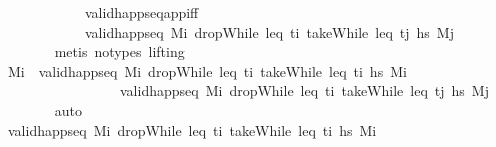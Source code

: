 \begin{isabellebody}
\ \ \ \ \ \ \ \ \ \ \ \ valid{\isacharunderscore}{\kern0pt}happ{\isacharunderscore}{\kern0pt}seq{\isacharunderscore}{\kern0pt}app{\isacharunderscore}{\kern0pt}iff\isanewline
\ \ \ \ \ \ \ \ \ \ \ \ {\isacartoucheopen}valid{\isacharunderscore}{\kern0pt}happ{\isacharunderscore}{\kern0pt}seq\ M\isactrlsub i\ {\isacharparenleft}{\kern0pt}dropWhile\ {\isacharparenleft}{\kern0pt}leq\ t\isactrlsub i{\isacharparenright}{\kern0pt}\ {\isacharparenleft}{\kern0pt}takeWhile\ {\isacharparenleft}{\kern0pt}leq\ t\isactrlsub j{\isacharparenright}{\kern0pt}\ hs\ M\isactrlsub j{\isacartoucheclose}\ \isanewline
\ \ \ \ \ \ \isamarkupfalse%
\ {\isacharparenleft}{\kern0pt}metis\ {\isacharparenleft}{\kern0pt}no{\isacharunderscore}{\kern0pt}types{\isacharcomma}{\kern0pt}\ lifting{\isacharparenright}{\kern0pt}{\isacharparenright}{\kern0pt}\isanewline
\ \ \ \ \isamarkupfalse%
\ \isamarkupfalse%
\ M\isactrlsub i{\isacharprime}{\kern0pt}\ \ {\isachardoublequoteopen}valid{\isacharunderscore}{\kern0pt}happ{\isacharunderscore}{\kern0pt}seq\ M\isactrlsub i\ {\isacharparenleft}{\kern0pt}dropWhile\ {\isacharparenleft}{\kern0pt}leq\ t\isactrlsub i{\isacharparenright}{\kern0pt}\ {\isacharparenleft}{\kern0pt}takeWhile\ {\isacharparenleft}{\kern0pt}leq\ t\isactrlsub i{\isacharprime}{\kern0pt}{\isacharparenright}{\kern0pt}\ hs\ M\isactrlsub i{\isacharprime}{\kern0pt}{\isachardoublequoteclose}\isanewline
\ \ \ \ \ \ \ \ \ \ \ \ \ \ \ \ \ {\isachardoublequoteopen}valid{\isacharunderscore}{\kern0pt}happ{\isacharunderscore}{\kern0pt}seq\ M\isactrlsub i{\isacharprime}{\kern0pt}\ {\isacharparenleft}{\kern0pt}dropWhile\ {\isacharparenleft}{\kern0pt}leq\ t\isactrlsub i{\isacharprime}{\kern0pt}{\isacharparenright}{\kern0pt}\ {\isacharparenleft}{\kern0pt}takeWhile\ {\isacharparenleft}{\kern0pt}leq\ t\isactrlsub j{\isacharparenright}{\kern0pt}\ hs\ M\isactrlsub j{\isachardoublequoteclose}\isanewline
\ \ \ \ \ \ \isamarkupfalse%
\ auto\isanewline
\ \ \ \ \isamarkupfalse%
\ \isamarkupfalse%
\ {\isachardoublequoteopen}valid{\isacharunderscore}{\kern0pt}happ{\isacharunderscore}{\kern0pt}seq\ M\isactrlsub i\ {\isacharparenleft}{\kern0pt}dropWhile\ {\isacharparenleft}{\kern0pt}leq\ t\isactrlsub i{\isacharparenright}{\kern0pt}\ {\isacharparenleft}{\kern0pt}takeWhile\ {\isacharparenleft}{\kern0pt}leq\ t\isactrlsub i{\isacharprime}{\kern0pt}{\isacharparenright}{\kern0pt}\ hs\ M\isactrlsub i{\isacharprime}{\kern0pt}{\isachardoublequoteclose}\isanewline

\end{isabellebody}
